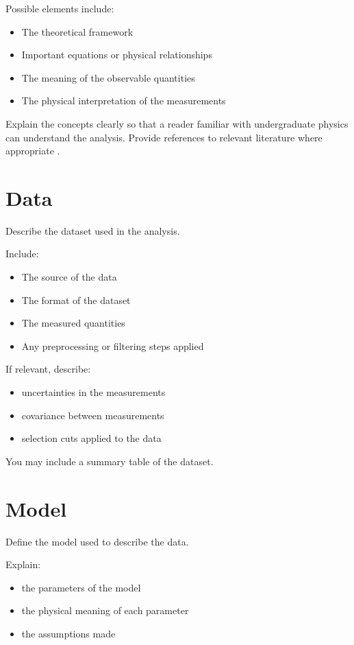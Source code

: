 \documentclass[11pt]{article}
\begin{document}
Possible elements include:
\begin{itemize}
\item The theoretical framework
\item Important equations or physical relationships
\item The meaning of the observable quantities
\item The physical interpretation of the measurements
\end{itemize}

Explain the concepts clearly so that a reader familiar with
undergraduate physics can understand the analysis. Provide references to relevant literature where appropriate \cite{example}.


\section{Data}

Describe the dataset used in the analysis.

Include:
\begin{itemize}
\item The source of the data
\item The format of the dataset
\item The measured quantities
\item Any preprocessing or filtering steps applied
\end{itemize}

If relevant, describe:
\begin{itemize}
\item uncertainties in the measurements
\item covariance between measurements
\item selection cuts applied to the data
\end{itemize}

You may include a summary table of the dataset.

\section{Model}

Define the model used to describe the data.

Explain:
\begin{itemize}
\item the parameters of the model
\item the physical meaning of each parameter
\item the assumptions made
\end{itemize}
\end{document}
